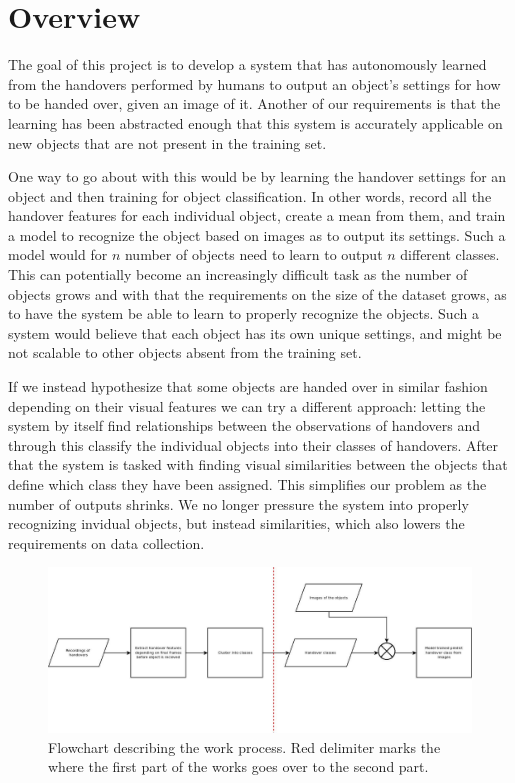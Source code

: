 \section{Overview}

The goal of this project is to develop a system that has autonomously learned from the handovers performed by humans to output an object's settings for how to be handed over, given an image of it. Another of our requirements is that the learning has been abstracted enough that this system is accurately applicable on new objects that are not present in the training set.

One way to go about with this would be by learning the handover settings for an object and then training for object classification. In other words, record all the handover features for each individual object, create a mean from them, and train a model to recognize the object based on images as to output its settings. Such a model would for \(n\) number of objects need to learn to output \(n\) different classes. This can potentially become an increasingly difficult task as the number of objects grows and with that the requirements on the size of the dataset grows, as to have the system be able to learn to properly recognize the objects. Such a system would believe that each object has its own unique settings, and might be not scalable to other objects absent from the training set.

If we instead hypothesize that some objects are handed over in similar fashion depending on their visual features we can try a different approach: letting the system by itself find relationships between the observations of handovers and through this classify the individual objects into their classes of handovers. After that the system is tasked with finding visual similarities between the objects that define which class they have been assigned. This simplifies our problem as the number of outputs shrinks. We no longer pressure the system into properly recognizing invidual objects, but instead similarities, which also lowers the requirements on data collection.

\begin{figure}
	\centering
	\includegraphics[width=\textwidth]{img/methods/flowchart.jpg}
	\caption{Flowchart describing the work process. Red delimiter marks the where the first part of the works goes over to the second part.}
	\label{fig:flowchart}
\end{figure}

